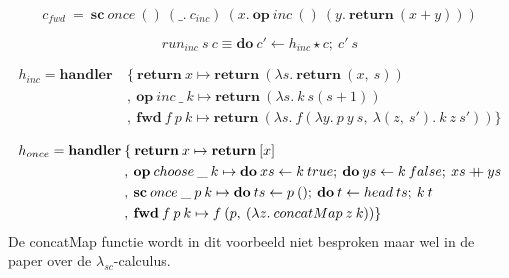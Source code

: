 \begin{equation}
    c_{fwd} \: = \: \textbf{sc}\:once\:()\:(\_.\:c_{inc})\:(x.\:\textbf{op}\:inc\:()\:(y.\:\textbf{return}\:(x+y)))
\end{equation}

\begin{equation}
    run_{inc} \:s\:c \equiv \textbf{do}\:c' \leftarrow h_{inc} \star c;\:c'\:s
\end{equation}

\begin{equation}
    \begin{split}
        h_{inc} = \textbf{handler}\: & \{\:\textbf{return}\:x \mapsto \textbf{return}\:(\lambda s.\: \textbf{return}\:(x,\:s)) \\
        & ,\:\textbf{op}\:inc\:\_\:k \mapsto \textbf{return}\:(\lambda s. \: k\:s(s+1)) \\
        & ,\: \textbf{fwd}\:f\:p\:k \mapsto \textbf{return}\:(\lambda s.\:f(\lambda y.\:p\:y\:s,\:\lambda (z,\:s').\: k\:z\:s'))\}
    \end{split}
\end{equation}

\begin{equation}
    \begin{split}
        h_{once} = \textbf{handler}\: & \{\:\textbf{return}\:x \mapsto \textbf{return}\:[x] \\
        & ,\:\textbf{op}\:choose\:\_\:k \mapsto \textbf{do}\:xs \leftarrow k\:true;\:\textbf{do}\:ys \leftarrow k\:false;\:xs \mathbin{{+}\mspace{-8mu}{+}} ys \\
        & ,\:\textbf{sc}\:once\:\_\:p\:k \mapsto \textbf{do}\:ts \leftarrow p\:();\:\textbf{do}\:t \leftarrow head \:ts;\:k\:t \\
        & ,\:\textbf{fwd}\:f\:p\:k \mapsto f\:(p,\:(\lambda z.\: concatMap \:z\:k))\}
    \end{split}
\end{equation}
De concatMap functie wordt in dit voorbeeld niet besproken maar wel in de paper over de $\lambda_{sc}$-calculus\cite{Bosman2022}.


